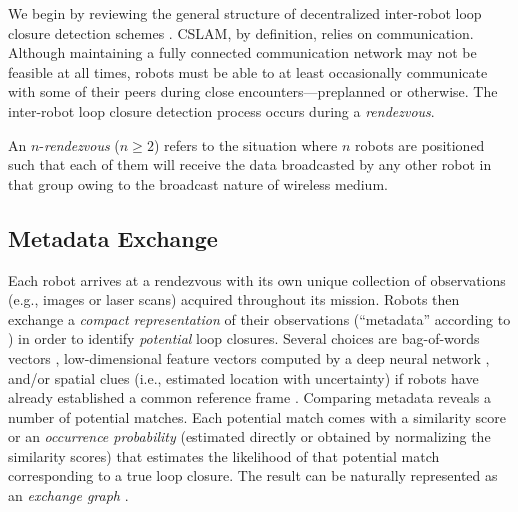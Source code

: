 \documentclass[conference]{IEEEtran}
\begin{document}
We begin by reviewing the general structure of decentralized inter-robot loop
closure detection schemes \cite{Giamou18_ICRA,cieslewski2017efficient,CieslewskiS17}.
CSLAM, by definition, relies on communication. Although maintaining a fully
connected communication
network may not be feasible at all times, robots must be able to
at least occasionally communicate with some of their peers during
close encounters---preplanned or otherwise. 
The inter-robot loop
closure detection process occurs during a \emph{rendezvous}. 
\begin{definition}[Rendezvous]
  \label{def:rendezvous}
  An $n$-\emph{rendezvous} ($n \geq 2$) refers to the situation where 
  $n$ robots are positioned such that each of them will receive the data broadcasted by
  any other robot in that group owing to the broadcast nature of wireless medium.
\end{definition}

\subsection{Metadata Exchange}
Each robot arrives at a rendezvous with its own unique collection of observations
(e.g., images or laser scans) acquired throughout its mission.
Robots then exchange a \emph{compact representation} of their observations
(``metadata'' according to \cite{Giamou18_ICRA}) in order
to identify \emph{potential} loop closures. Several choices are 
bag-of-words vectors \cite{cieslewski2017efficient,Giamou18_ICRA},
low-dimensional feature vectors computed by a deep neural network
\cite{CieslewskiS17}, and/or spatial clues (i.e., estimated location with
uncertainty) if robots have already established a common reference frame
\cite{Giamou18_ICRA}. 
Comparing metadata reveals a number of potential matches. Each
potential match comes with a similarity score \cite{GalvezTRO12} or an
\emph{occurrence probability} (estimated directly or obtained by normalizing the
similarity scores) that estimates the
likelihood 
of that potential match corresponding to a true loop closure.
The result can be naturally represented as an \emph{exchange graph}
\cite{Giamou18_ICRA}.
\end{document}
